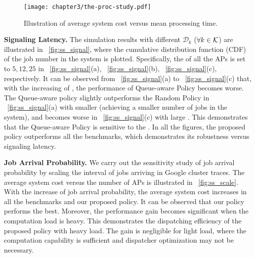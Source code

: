 \begin{figure*}[hbt]                                                 %
    \centering                                                      %
    \texttt{[image: chapter3/the-proc-study.pdf]}      %
    \caption{Illustration of average system cost versus mean processing time.}
    \label{fig:ss_dist}                                             %
\end{figure*}                                                        %

\noindent\textbf{Signaling Latency.}
The simulation results with different {\brlatency} $\mathcal{D}_{k}$ ($\forall k\in\mathcal{K}$) are illustrated in \figurename~\ref{fig:ss_signal}, where the cumulative distribution function (CDF) of the job number in the system is plotted.
Specifically, the {\brlatency} of all the APs is set to $5, 12, 25$ in \figurename~\ref{fig:ss_signal}(a), \figurename~\ref{fig:ss_signal}(b), \figurename~\ref{fig:ss_signal}(c), respectively.
It can be observed from \figurename~\ref{fig:ss_signal}(a) to \figurename~\ref{fig:ss_signal}(c) that, with the increasing of {\brlatency}, the performance of Queue-aware Policy becomes worse.
The Queue-aware policy slightly outperforms the Random Policy in \figurename~\ref{fig:ss_signal}(a) with smaller {\brlatency} (achieving a smaller number of jobs in the system), and becomes worse in \figurename~\ref{fig:ss_signal}(c) with large {\brlatency}.
This demonstrates that the Queue-aware Policy is sensitive to the {\brlatency}.
In all the figures, the proposed policy outperforms all the benchmarks, which demonstrates its robustness versus signaling latency.

\noindent\textbf{Job Arrival Probability.}
We carry out the sensitivity study of job arrival probability by scaling the interval of jobs arriving in Google cluster traces.
The average system cost versus the number of APs is illustrated in \figurename~\ref{fig:ss_scale}.
With the {increase} of job arrival probability, the average system cost increases in all the benchmarks and our proposed policy.
It can be observed that our policy performs the best.
Moreover, the performance gain becomes significant when the computation load is heavy.
This demonstrates the dispatching efficiency of the proposed policy with heavy load.
The gain is negligible for light load, where the computation capability is sufficient and dispatcher optimization may not be necessary.

